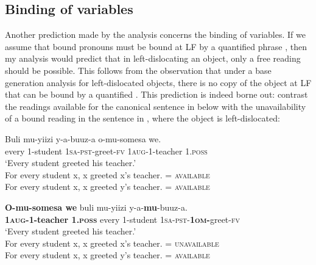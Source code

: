 \documentclass[output=paper,newtxmath,modfonts,nonflat,hidelinks]{langsci/langscibook}
\begin{document}
\subsection{Binding of variables}\label{sec:ranero:5.2}

{Another prediction made by the analysis concerns the binding of variables. If we assume that bound pronouns must be bound at LF by a quantified phrase \citep[see][]{Hornstein1990}, then my analysis would predict that in left-dislocating an object, only a free reading should be possible. This follows from the observation that under a base generation analysis for left-dislocated objects, there is no copy of the object at LF that can be bound by a quantified . This prediction is indeed borne out: contrast the readings available for the canonical sentence in  below with the unavailability of a bound reading in the sentence in , where the object is left-dislocated:}


\ea\label{ex:ranero:35}
\gll Buli   mu-yiizi   y-a-buuz-a     o-mu-somesa     we.\\
every 1-student  \textsc{1sa-pst}{}-greet-\textsc{fv} \textsc{1aug-}1-teacher 1.\textsc{poss}\\
\glt ‘Every student greeted his teacher.’\\ 
\-\hspace{1cm}For every student x, x greeted x’s teacher. = \textsc{available}\\
\-\hspace{1cm}For every student x, x greeted y’s teacher. = \textsc{available}
\z

\ea\label{ex:ranero:36}
\gll \textbf{O-mu-somesa  we}         buli    mu-yiizi   y-a-\textbf{mu}{}-buuz-a.\\
\textbf{1\textsc{aug}}\textbf{{}-1-teacher 1.}\textbf{\textsc{poss}} every 1-student \textsc{1sa-pst-}\textbf{\textsc{1om}}\textbf{{}-}greet-\textsc{fv}\\
\glt ‘Every student greeted his teacher.’\\ 
\-\hspace{1cm}For every student x, x greeted x’s teacher. = \textsc{unavailable}\\
\-\hspace{1cm}For every student x, x greeted y’s teacher. = \textsc{available}
\z
\end{document}
